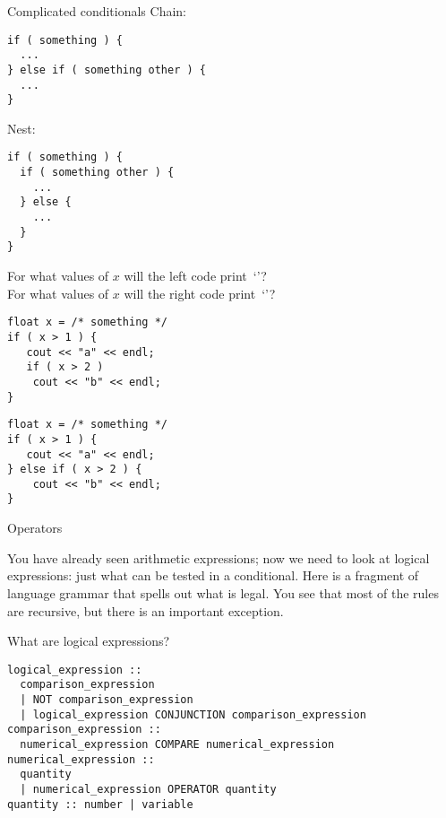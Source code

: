 \begin{slide}{Complicated conditionals}
  \label{sl:elseif}
  Chain:
\begin{lstlisting}
if ( something ) {
  ...
} else if ( something other ) {
  ...
}
\end{lstlisting}
Nest:
\begin{lstlisting}
if ( something ) {
  if ( something other ) {
    ...
  } else {
    ...
  }
}
\end{lstlisting}
\end{slide}

\begin{exercise}
  \label{ex:if-scope-ab}
  For what values of $x$ will the left code print~`'?\\
  For what values of $x$ will the right code print~`'?
  \begin{multicols}{2}
\begin{lstlisting}
float x = /* something */
if ( x > 1 ) {
   cout << "a" << endl;
   if ( x > 2 )
    cout << "b" << endl;
}
\end{lstlisting}
\columnbreak
\begin{lstlisting}
float x = /* something */
if ( x > 1 ) {
   cout << "a" << endl;
} else if ( x > 2 ) {
    cout << "b" << endl;
}
\end{lstlisting}
  \end{multicols}
\end{exercise}

 {Operators}

You have already seen arithmetic expressions; now we need to look at
logical expressions: just what can be tested in a conditional. 
Here is a fragment of language grammar that spells out what is
legal. You see that most of the rules are recursive, but there is an
important exception.

\begin{block}{What are logical expressions?}
  \label{sl:logical-syntax}
\begin{verbatim}
logical_expression :: 
  comparison_expression
  | NOT comparison_expression
  | logical_expression CONJUNCTION comparison_expression
comparison_expression :: 
  numerical_expression COMPARE numerical_expression
numerical_expression :: 
  quantity
  | numerical_expression OPERATOR quantity
quantity :: number | variable
\end{verbatim}
\end{block}


